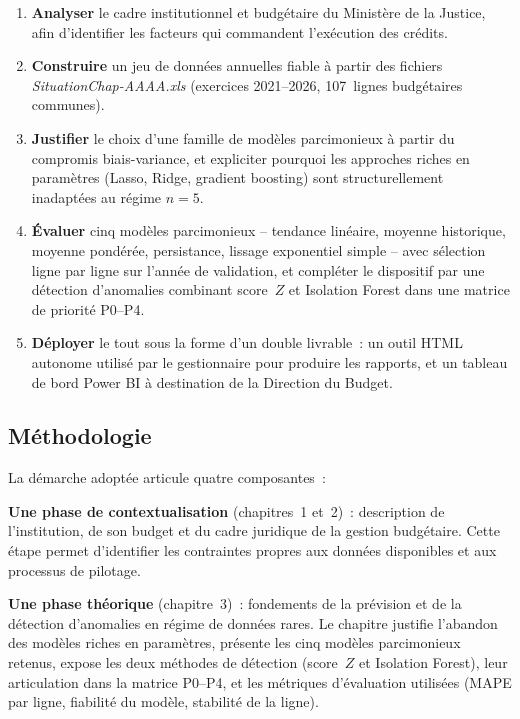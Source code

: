\documentclass[12pt,a4paper]{article}
\begin{document}
\begin{enumerate}
    \item \textbf{Analyser} le cadre institutionnel et budg\'etaire du Minist\`ere de la Justice, afin d'identifier les facteurs qui commandent l'ex\'ecution des cr\'edits.
    \item \textbf{Construire} un jeu de donn\'ees annuelles fiable \`a partir des fichiers \textit{SituationChap-AAAA.xls} (exercices 2021--2026, 107~lignes budg\'etaires communes).
    \item \textbf{Justifier} le choix d'une famille de mod\`eles parcimonieux \`a partir du compromis biais-variance, et expliciter pourquoi les approches riches en param\`etres (Lasso, Ridge, gradient boosting) sont structurellement inadapt\'ees au r\'egime $n=5$.
    \item \textbf{\'Evaluer} cinq mod\`eles parcimonieux -- tendance lin\'eaire, moyenne historique, moyenne pond\'er\'ee, persistance, lissage exponentiel simple -- avec s\'election ligne par ligne sur l'ann\'ee de validation, et compl\'eter le dispositif par une d\'etection d'anomalies combinant score~$Z$ et Isolation Forest dans une matrice de priorit\'e P0--P4.
    \item \textbf{D\'eployer} le tout sous la forme d'un double livrable~: un outil HTML autonome utilis\'e par le gestionnaire pour produire les rapports, et un tableau de bord Power BI \`a destination de la Direction du Budget.
\end{enumerate}

\subsection*{M\'ethodologie}

La d\'emarche adopt\'ee articule quatre composantes~:

\textbf{Une phase de contextualisation} (chapitres~1 et~2)~: description de l'institution, de son budget et du cadre juridique de la gestion budg\'etaire. Cette \'etape permet d'identifier les contraintes propres aux donn\'ees disponibles et aux processus de pilotage.

\textbf{Une phase th\'eorique} (chapitre~3)~: fondements de la pr\'evision et de la d\'etection d'anomalies en r\'egime de donn\'ees rares. Le chapitre justifie l'abandon des mod\`eles riches en param\`etres, pr\'esente les cinq mod\`eles parcimonieux retenus, expose les deux m\'ethodes de d\'etection (score~$Z$ et Isolation Forest), leur articulation dans la matrice P0--P4, et les m\'etriques d'\'evaluation utilis\'ees (MAPE par ligne, fiabilit\'e du mod\`ele, stabilit\'e de la ligne).
\end{document}
